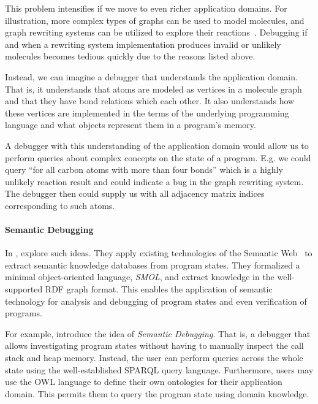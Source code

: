 \documentclass[
	english,
	accentcolor=9c,%
  marginpar=0cm %
	]{tudapub}
\begin{document}
This problem intensifies if we move to even richer application domains.
For illustration, more complex types of graphs can be used to model molecules,
and graph rewriting systems can be utilized to explore their
reactions~\cite{yadav2004potential,mann2013graph}.
%
Debugging if and when a rewriting system implementation produces invalid or
unlikely molecules becomes tedious quickly due to the reasons listed above.

Instead, we can imagine a debugger that understands the application domain.
That is, it understands that atoms are modeled as vertices in a molecule graph
and that they have bond relations which each other. 
%
It also understands how these vertices are implemented in the terms of the
underlying programming language and what objects represent them in a program's
memory.

A debugger with this understanding of the application domain would allow us to
perform queries about complex concepts on the state of a program.
E.g. we could query \enquote{for all carbon atoms with more than four bonds}
which is a highly unlikely reaction result and could indicate a bug in the graph
rewriting system.
The debugger then could supply us with all adjacency matrix indices
corresponding to such atoms.

\paragraph{Semantic Debugging}

In \cite{kamburjan2021programming}, \citeauthor{kamburjan2021programming}
explore such ideas. They apply existing technologies of the Semantic
Web~\cite{semanticweb} to extract semantic knowledge databases from program
states. They formalized a minimal object-oriented language, \emph{SMOL}, and
extract knowledge in the well-supported RDF graph format.
%
This enables the application of semantic technology for analysis and debugging
of program states and even verification of programs.

For example, \citeauthor{kamburjan2021programming} introduce the idea of
\emph{Semantic Debugging}.
That is, a debugger that allows investigating program states without having to
manually inspect the call stack and heap memory.
Instead, the user can perform queries across the whole state using the
well-established SPARQL query language.
Furthermore, users may use the OWL language to define their own ontologies for
their application domain. This permits them to query the program state using
domain knowledge.
\end{document}
